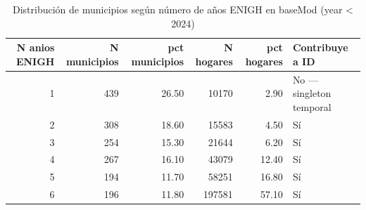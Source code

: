 \begin{table}[ht]
\centering
\caption{Distribución de municipios según número de años ENIGH en baseMod (year < 2024)} 
\label{tab:id_ID1_panel_balance}
\begin{tabular}{rrrrrl}
  \toprule
N anios ENIGH & N municipios & pct municipios & N hogares & pct hogares & Contribuye a ID \\ 
  \midrule
  1 & 439 & 26.50 & 10170 & 2.90 & No — singleton temporal \\ 
    2 & 308 & 18.60 & 15583 & 4.50 & Sí \\ 
    3 & 254 & 15.30 & 21644 & 6.20 & Sí \\ 
    4 & 267 & 16.10 & 43079 & 12.40 & Sí \\ 
    5 & 194 & 11.70 & 58251 & 16.80 & Sí \\ 
    6 & 196 & 11.80 & 197581 & 57.10 & Sí \\ 
   \bottomrule
\end{tabular}
\end{table}

